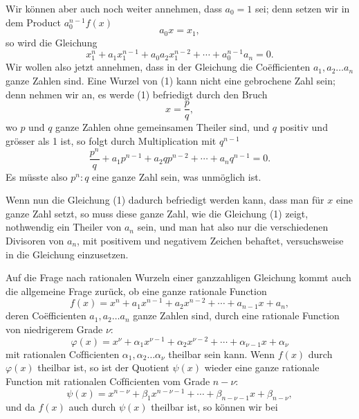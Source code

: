 Wir können aber auch noch weiter annehmen, dass $a_0 = 1$ sei; denn setzen wir in dem Product $a_0^{n-1} f(x)$
\[
a_0 x = x_1,
\]
so wird die Gleichung
\[
x_1^n + a_1 x_1^{n-1} + a_0 a_2 x_1^{n-2} + \cdots + a_0^{n-1} a_n = 0.
\]
Wir wollen also jetzt annehmen, dass in der Gleichung
die Co\"efficienten $a_1, a_2 \ldots a_n$ ganze Zahlen sind. Eine  Wurzel von (1) kann nicht eine gebrochene Zahl sein; denn nehmen wir an, es werde (1) befriedigt durch den Bruch
\[
x = \frac{p}{q},
\]
wo $p$ und $q$ ganze Zahlen ohne gemeinsamen Theiler sind, und $q$ positiv und grösser als 1 ist, so folgt durch Multiplication mit $q^{n-1}$
\[
\frac{p^n}{q} + a_1 p^{n-1} + a_2 q p^{n-2} + \cdots + a_n q^{n-1} = 0.
\]
Es müsste also $p^n : q$ eine ganze Zahl sein, was unmöglich ist.

Wenn nun die Gleichung (1) dadurch befriedigt werden kann, dass man für $x$ eine ganze Zahl setzt, so muss diese ganze Zahl, wie die Gleichung (1) zeigt, nothwendig ein Theiler von $a_n$ sein, und man hat also nur die verschiedenen Divisoren von $a_n$, mit positivem und negativem Zeichen behaftet, versuchsweise in die Gleichung einzusetzen.

Auf die Frage nach rationalen Wurzeln einer ganzzahligen Gleichung kommt auch die allgemeine Frage zurück, ob eine ganze rationale Function
\[
f(x) = x^n + a_1 x^{n-1} + a_2 x^{n-2} + \cdots + a_{n-1} x + a_n,
\]
deren Co\"efficienten $a_1, a_2 \ldots a_n$ ganze Zahlen sind, durch eine rationale Function von niedrigerem Grade $\nu$:
\[
\varphi(x) = x^\nu + \alpha_1 x^{\nu-1} + \alpha_2 x^{\nu-2} + \cdots + \alpha_{\nu-1} x + \alpha_\nu
\]
mit rationalen Co\"fficienten $\alpha_1, \alpha_2 \ldots \alpha_\nu$ theilbar sein kann. Wenn $f(x)$ durch $\varphi(x)$ theilbar ist, so ist der Quotient $\psi(x)$ wieder eine ganze rationale Function mit rationalen Co\"fficienten vom Grade $n - \nu$:
\[
\psi(x) = x^{n-\nu} + \beta_1 x^{n-\nu-1} + \cdots + \beta_{n-\nu-1} x + \beta_{n-\nu},
\]
und da $f(x)$ auch durch $\psi(x)$ theilbar ist, so können wir bei
